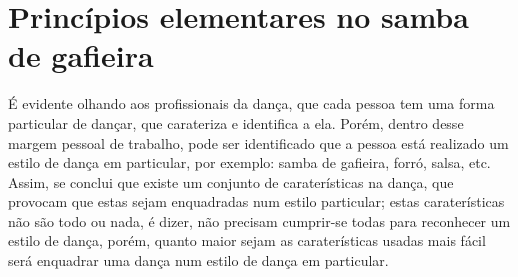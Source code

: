 \section{Princípios elementares no samba de gafieira}
\label{sec:principiosambagafieira}

É evidente olhando aos profissionais da dança,
que cada pessoa tem uma forma particular de dançar, 
que carateriza e identifica a ela. Porém, 
dentro desse margem pessoal de trabalho, 
pode ser identificado que a pessoa está realizado um estilo de dança em particular,
por exemplo: samba de gafieira, forró, salsa, etc.
Assim, se conclui que existe um conjunto de caraterísticas na dança,
que provocam que estas sejam enquadradas num estilo particular;
estas caraterísticas não são todo ou nada, é dizer, 
não precisam cumprir-se todas para reconhecer um estilo de dança,
porém, quanto maior sejam as caraterísticas usadas mais fácil será enquadrar uma dança num estilo de dança em particular.

